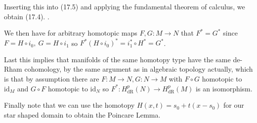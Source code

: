 Inserting this into (17.5) and applying the fundamental theorem of calculus, we
obtain (17.4). \qquad \square.

We then have for arbitrary homotopic maps  \( F, G : M \to N \) that 
\( F^\ast = G^\ast \) since \( F = H \circ i_0,\ G = H \circ i_1 \)
so \( F^\ast (H \circ i_0)^\ast = i_1^\ast \circ H^\ast = G^\ast \).

Last this implies that manifolds of the same homotopy type have the same de-Rham cohomology,
by the same argument as in algebraic topology actually, which is 
that by assumption there are \( F : M \to N, G : N \to M \) with \( F \circ G \) homotopic to \( \text{id}_{M} \)
and \( G \circ F \) homotopic to \( \text{id}_{N} \) so \( F^\ast : H_{\text{dR}}^p(N) \to H_{\text{dR}}^p(M) \)
is an isomorphism.

Finally note that we can use the homotopy \( H(x, t) = s_0 + t(x - s_0) \) for our star shaped domain to obtain the Poincare Lemma. 
